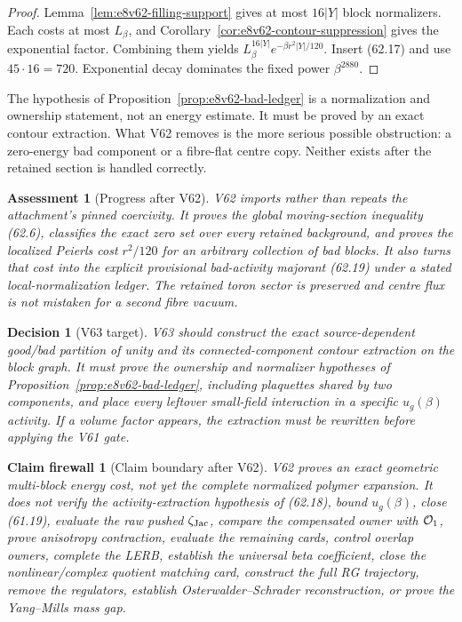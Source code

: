 \documentclass[11pt,oneside]{book}
\newtheorem{assessment}[theorem]{Assessment}
\newtheorem{firewall}[theorem]{Claim firewall}
\newtheorem{decision}[theorem]{Decision}
\theoremstyle{definition}
\theoremstyle{remark}
\begin{document}
\begin{proof}
Lemma~\ref{lem:e8v62-filling-support} gives at most
\(16|Y|\) block normalizers.  Each costs at most \(L_\beta\), and
Corollary~\ref{cor:e8v62-contour-suppression} gives the exponential
factor.  Combining them yields
\(L_\beta^{16|Y|}e^{-\beta r^2|Y|/120}\).  Insert (62.17) and use
\(45\cdot16=720\).  Exponential decay dominates the fixed power
\(\beta^{2880}\).
\end{proof}

The hypothesis of Proposition~\ref{prop:e8v62-bad-ledger} is a
normalization and ownership statement, not an energy estimate.  It
must be proved by an exact contour extraction.  What V62 removes is
the more serious possible obstruction: a zero-energy bad component
or a fibre-flat centre copy.  Neither exists after the retained
section is handled correctly.

\begin{assessment}[Progress after V62]
\label{ass:e8v62-status}
V62 imports rather than repeats the attachment's pinned coercivity.
It proves the global moving-section inequality (62.6), classifies
the exact zero set over every retained background, and proves the
localized Peierls cost \(r^2/120\) for an arbitrary collection of
bad blocks.  It also turns that cost into the explicit provisional
bad-activity majorant (62.19) under a stated local-normalization
ledger.  The retained toron sector is preserved and centre flux is
not mistaken for a second fibre vacuum.
\end{assessment}

\begin{decision}[V63 target]
\label{dec:e8v62-next}
V63 should construct the exact source-dependent good/bad partition
of unity and its connected-component contour extraction on the
block graph.  It must prove the ownership and normalizer hypotheses
of Proposition~\ref{prop:e8v62-bad-ledger}, including plaquettes
shared by two components, and place every leftover small-field
interaction in a specific \(u_g(\beta)\) activity.  If a volume
factor appears, the extraction must be rewritten before applying
the V61 gate.
\end{decision}

\begin{firewall}[Claim boundary after V62]
\label{fire:e8v62-claim}
V62 proves an exact geometric multi-block energy cost, not yet the
complete normalized polymer expansion.  It does not verify the
activity-extraction hypothesis of (62.18), bound
\(u_g(\beta)\), close (61.19), evaluate the raw pushed
\(\zeta_{\rm Jac}\), compare the compensated owner with
\({\cal O}_1\), prove anisotropy contraction, evaluate the remaining
cards, control overlap owners, complete the LERB, establish the
universal beta coefficient, close the nonlinear/complex quotient
matching card, construct the full RG trajectory, remove the
regulators, establish Osterwalder--Schrader reconstruction, or prove
the Yang--Mills mass gap.
\end{firewall}
\end{document}
